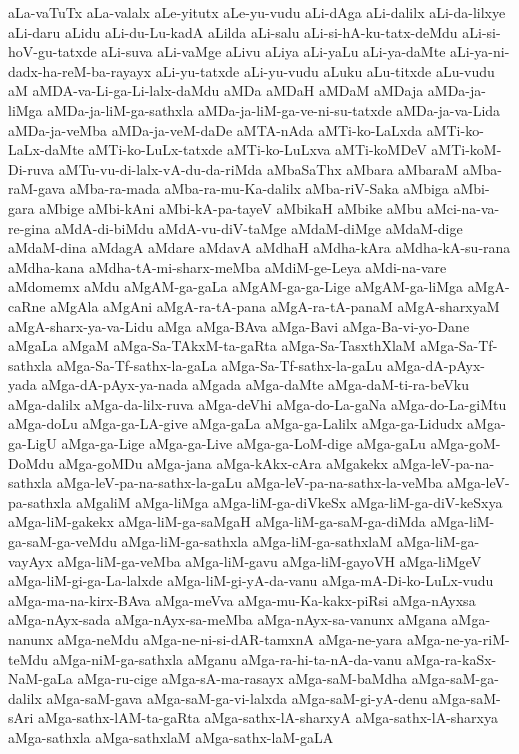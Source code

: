 {aLa-vaTuTx
aLa-valalx
aLe-yitutx
aLe-yu-vudu
aLi-dAga
aLi-dalilx
aLi-da-lilxye
aLi-daru
aLidu
aLi-du-Lu-kadA
aLilda
aLi-salu
aLi-si-hA-ku-tatx-deMdu
aLi-si-hoV-gu-tatxde
aLi-suva
aLi-vaMge
aLivu
aLiya
aLi-yaLu
aLi-ya-daMte
aLi-ya-ni-dadx-ha-reM-ba-rayayx
aLi-yu-tatxde
aLi-yu-vudu
aLuku
aLu-titxde
aLu-vudu
aM
aMDA-va-Li-ga-Li-lalx-daMdu
aMDa
aMDaH
aMDaM
aMDaja
aMDa-ja-liMga
aMDa-ja-liM-ga-sathxla
aMDa-ja-liM-ga-ve-ni-su-tatxde
aMDa-ja-va-Lida
aMDa-ja-veMba
aMDa-ja-veM-daDe
aMTA-nAda
aMTi-ko-LaLxda
aMTi-ko-LaLx-daMte
aMTi-ko-LuLx-tatxde
aMTi-ko-LuLxva
aMTi-koMDeV
aMTi-koM-Di-ruva
aMTu-vu-di-lalx-vA-du-da-riMda
aMbaSaThx
aMbara
aMbaraM
aMba-raM-gava
aMba-ra-mada
aMba-ra-mu-Ka-dalilx
aMba-riV-Saka
aMbiga
aMbi-gara
aMbige
aMbi-kAni
aMbi-kA-pa-tayeV
aMbikaH
aMbike
aMbu
aMci-na-va-re-gina
aMdA-di-biMdu
aMdA-vu-diV-taMge
aMdaM-diMge
aMdaM-dige
aMdaM-dina
aMdagA
aMdare
aMdavA
aMdhaH
aMdha-kAra
aMdha-kA-su-rana
aMdha-kana
aMdha-tA-mi-sharx-meMba
aMdiM-ge-Leya
aMdi-na-vare
aMdomemx
aMdu
aMgAM-ga-gaLa
aMgAM-ga-ga-Lige
aMgAM-ga-liMga
aMgA-caRne
aMgAla
aMgAni
aMgA-ra-tA-pana
aMgA-ra-tA-panaM
aMgA-sharxyaM
aMgA-sharx-ya-va-Lidu
aMga
aMga-BAva
aMga-Bavi
aMga-Ba-vi-yo-Dane
aMgaLa
aMgaM
aMga-Sa-TAkxM-ta-gaRta
aMga-Sa-TasxthXlaM
aMga-Sa-Tf-sathxla
aMga-Sa-Tf-sathx-la-gaLa
aMga-Sa-Tf-sathx-la-gaLu
aMga-dA-pAyx-yada
aMga-dA-pAyx-ya-nada
aMgada
aMga-daMte
aMga-daM-ti-ra-beVku
aMga-dalilx
aMga-da-lilx-ruva
aMga-deVhi
aMga-do-La-gaNa
aMga-do-La-giMtu
aMga-doLu
aMga-ga-LA-give
aMga-gaLa
aMga-ga-Lalilx
aMga-ga-Lidudx
aMga-ga-LigU
aMga-ga-Lige
aMga-ga-Live
aMga-ga-LoM-dige
aMga-gaLu
aMga-goM-DoMdu
aMga-goMDu
aMga-jana
aMga-kAkx-cAra
aMgakekx
aMga-leV-pa-na-sathxla
aMga-leV-pa-na-sathx-la-gaLu
aMga-leV-pa-na-sathx-la-veMba
aMga-leV-pa-sathxla
aMgaliM
aMga-liMga
aMga-liM-ga-diVkeSx
aMga-liM-ga-diV-keSxya
aMga-liM-gakekx
aMga-liM-ga-saMgaH
aMga-liM-ga-saM-ga-diMda
aMga-liM-ga-saM-ga-veMdu
aMga-liM-ga-sathxla
aMga-liM-ga-sathxlaM
aMga-liM-ga-vayAyx
aMga-liM-ga-veMba
aMga-liM-gavu
aMga-liM-gayoVH
aMga-liMgeV
aMga-liM-gi-ga-La-lalxde
aMga-liM-gi-yA-da-vanu
aMga-mA-Di-ko-LuLx-vudu
aMga-ma-na-kirx-BAva
aMga-meVva
aMga-mu-Ka-kakx-piRsi
aMga-nAyxsa
aMga-nAyx-sada
aMga-nAyx-sa-meMba
aMga-nAyx-sa-vanunx
aMgana
aMga-nanunx
aMga-neMdu
aMga-ne-ni-si-dAR-tamxnA
aMga-ne-yara
aMga-ne-ya-riM-teMdu
aMga-niM-ga-sathxla
aMganu
aMga-ra-hi-ta-nA-da-vanu
aMga-ra-kaSx-NaM-gaLa
aMga-ru-cige
aMga-sA-ma-rasayx
aMga-saM-baMdha
aMga-saM-ga-dalilx
aMga-saM-gava
aMga-saM-ga-vi-lalxda
aMga-saM-gi-yA-denu
aMga-saM-sAri
aMga-sathx-lAM-ta-gaRta
aMga-sathx-lA-sharxyA
aMga-sathx-lA-sharxya
aMga-sathxla
aMga-sathxlaM
aMga-sathx-laM-gaLA
}
